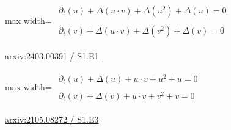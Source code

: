 \documentclass[UTF8,10pt,a4paper,fontset=mac]{ctexart}
\begin{document}
\begin{minipage}{\linewidth}\begin{center}\begin{adjustbox}{max width=\linewidth}$\displaystyle\begin{gathered}\begin{gathered}\partial_{t}(u)+\Delta(u\cdot v)+\Delta(u^{2})+\Delta(u)=0\end{gathered}\\[5pt]\begin{gathered}\partial_{t}(v)+\Delta(u\cdot v)+\Delta(v^{2})+\Delta(v)=0\end{gathered}\end{gathered}$\end{adjustbox}\end{center}{\small\href{https://arxiv.org/html/2403.00391#S1.E1}{arxiv:2403.00391 / S1.E1}}\par\end{minipage}\par\vspace{6mm}

\begin{minipage}{\linewidth}\begin{center}\begin{adjustbox}{max width=\linewidth}$\displaystyle\begin{gathered}\begin{gathered}\partial_{t}(u)+\Delta(u)+u\cdot v+u^{2}+u=0\end{gathered}\\[5pt]\begin{gathered}\partial_{t}(v)+\Delta(v)+u\cdot v+v^{2}+v=0\end{gathered}\end{gathered}$\end{adjustbox}\end{center}{\small\href{https://arxiv.org/html/2105.08272#S1.E3}{arxiv:2105.08272 / S1.E3}}\par\end{minipage}\par\vspace{6mm}
\end{document}

